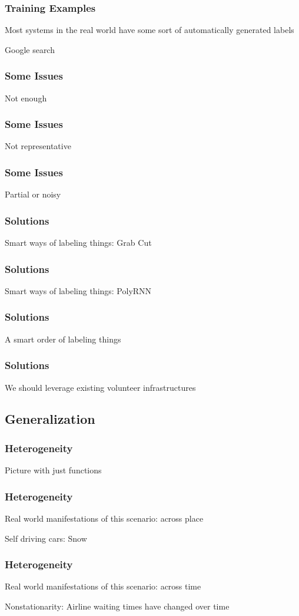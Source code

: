 \documentclass[10pt,mathserif]{beamer}
\begin{document}
\begin{frame}
  \frametitle{Training Examples}
  Most systems in the real world have some sort of automatically generated labels

  Google search
\end{frame}

\begin{frame}
  \frametitle{Some Issues}
  Not enough
\end{frame}

\begin{frame}
  \frametitle{Some Issues}
  Not representative
\end{frame}

\begin{frame}
  \frametitle{Some Issues}
  Partial or noisy
\end{frame}

\begin{frame}
  \frametitle{Solutions}
  Smart ways of labeling things: Grab Cut
\end{frame}

\begin{frame}
  \frametitle{Solutions}
  Smart ways of labeling things: PolyRNN
\end{frame}

\begin{frame}
  \frametitle{Solutions}
  A smart order of labeling things
\end{frame}

\begin{frame}
  \frametitle{Solutions}
  We should leverage existing volunteer infrastructures
\end{frame}

\subsection{Generalization}
\label{subsec:label}

\begin{frame}
  \frametitle{Heterogeneity}
  Picture with just functions
\end{frame}

\begin{frame}
  \frametitle{Heterogeneity}
  Real world manifestations of this scenario: across place

  Self driving cars: Snow
\end{frame}

\begin{frame}
  \frametitle{Heterogeneity}
  Real world manifestations of this scenario: across time

  Nonstationarity: Airline waiting times have changed over time
\end{frame}
\end{document}
